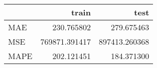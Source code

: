 \begin{tabular}{lrr}
\toprule
{} &          train &           test \\
\midrule
MAE  &     230.765802 &     279.675463 \\
MSE  &  769871.391417 &  897413.260368 \\
MAPE &     202.121451 &     184.371300 \\
\bottomrule
\end{tabular}
